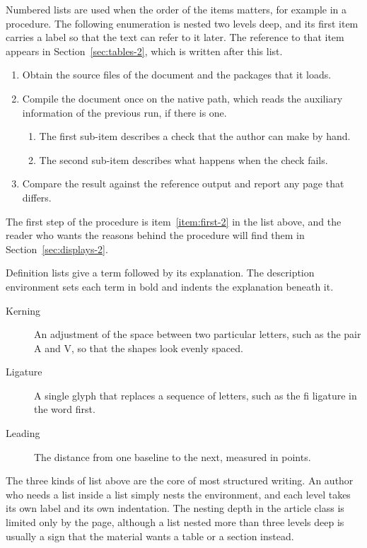 \documentclass{article}
\begin{document}
Numbered lists are used when the order of the items matters, for example in a
procedure. The following enumeration is nested two levels deep, and its first item
carries a label so that the text can refer to it later. The reference to that item
appears in Section~\ref{sec:tables-2}, which is written after this list.

\begin{enumerate}
  \item\label{item:first-2} Obtain the source files of the document and the packages that
        it loads.
  \item Compile the document once on the native path, which reads the auxiliary
        information of the previous run, if there is one.
        \begin{enumerate}
          \item The first sub-item describes a check that the author can make by hand.
          \item The second sub-item describes what happens when the check fails.
        \end{enumerate}
  \item Compare the result against the reference output and report any page that
        differs.
\end{enumerate}

The first step of the procedure is item~\ref{item:first-2} in the list above, and the
reader who wants the reasons behind the procedure will find them in
Section~\ref{sec:displays-2}.

Definition lists give a term followed by its explanation. The description environment
sets each term in bold and indents the explanation beneath it.

\begin{description}
  \item[Kerning] An adjustment of the space between two particular letters, such as
        the pair A and V, so that the shapes look evenly spaced.
  \item[Ligature] A single glyph that replaces a sequence of letters, such as the
        fi ligature in the word first.
  \item[Leading] The distance from one baseline to the next, measured in points.
\end{description}

The three kinds of list above are the core of most structured writing. An author who
needs a list inside a list simply nests the environment, and each level takes its own
label and its own indentation. The nesting depth in the article class is limited only
by the page, although a list nested more than three levels deep is usually a sign that
the material wants a table or a section instead.
\end{document}
